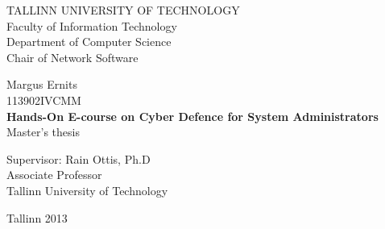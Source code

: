 \begin{titlepage}
	\begingroup
		\singlespace
		\begin{center}
			TALLINN UNIVERSITY OF TECHNOLOGY \\
			Faculty of Information Technology \\
			Department of Computer Science \\
			Chair of Network Software
		
			\vfill
				Margus Ernits \\
				113902IVCMM \\[1.5cm]
				\LARGE \textbf{Hands-On E-course on Cyber Defence for System Administrators} \\[1cm]
				\normalsize Master's thesis \\[4cm]

				\begin{flushright}
					Supervisor: Rain Ottis, Ph.D \\
					Associate Professor \\
					Tallinn University of Technology
					
				\end{flushright}
			\vfill

			Tallinn 2013
		\end{center}
	\endgroup
\end{titlepage}